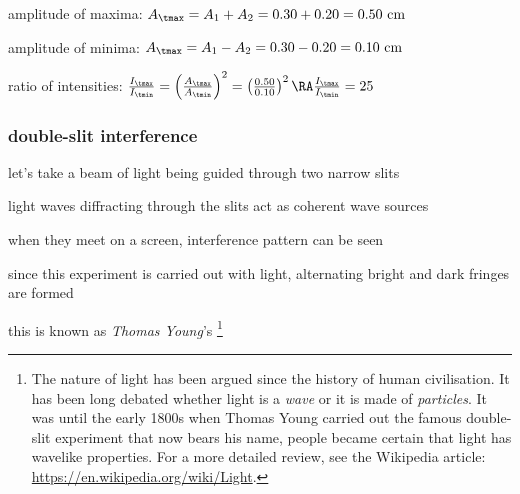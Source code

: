 
\sol amplitude of maxima: $A_\tmax = A_1 + A_2 = 0.30 + 0.20 = 0.50 \text{ cm}$

amplitude of minima: $A_\tmax = A_1 - A_2 = 0.30 - 0.20 = 0.10 \text{ cm}$

ratio of intensities: $\frac{I_\tmax}{I_\tmin} = \left( \frac{A_\tmax}{A_\tmin} \right)^2 = \left( \frac{0.50}{0.10} \right)^2 \RA \frac{I_\tmax}{I_\tmin} = 25$ \eoe
 




\newpage


\subsubsection{double-slit interference}

let's take a beam of light being guided through two narrow slits

light waves diffracting through the slits act as coherent wave sources

when they meet on a screen, interference pattern can be seen

since this experiment is carried out with light, alternating bright and dark fringes are formed

this is known as \emph{Thomas Young}'s 
\footnote{The nature of light has been argued since the history of human civilisation. It has been long debated whether light is a \emph{wave} or it is made of \emph{particles}. It was until the early 1800s when Thomas Young carried out the famous double-slit experiment that now bears his name, people became certain that light has wavelike properties. For a more detailed review, see the Wikipedia article: \url{https://en.wikipedia.org/wiki/Light}.}

